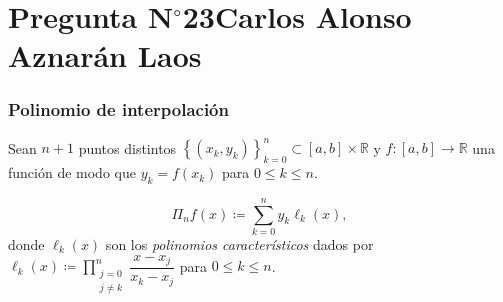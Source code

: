 \section{Pregunta N$^{\circ}$23\qquad Carlos Alonso Aznarán Laos}

\begin{frame}
	\frametitle{Polinomio de interpolación}

	Sean $n+1$ puntos distintos
	\begin{math}
		{
			\left\{
			\left(x_{k},y_{k}\right)
			\right\}
		}_{k=0}^{n}\subset
		\left[a,b\right]\times\mathbb{R}
	\end{math}
	y
	\begin{math}
		f\colon\left[a,b\right]\to
		\mathbb{R}
	\end{math}
	una función de modo que
	\begin{math}
		y_{k}=
		f\left(x_{k}\right)
	\end{math}
	para $0\leq k\leq n$.

	\begin{definition}
		\begin{equation*}
			\Pi_{n}
			f\left(x\right)\coloneqq
			\sum\limits_{k=0}^{n}
			y_{k}
			\ell_{k}\left(x\right),
		\end{equation*}
		donde $\ell_{k}\left(x\right)$ son los
		\emph{polinomios característicos} dados por
		\begin{math}
			\ell_{k}
			\left(x\right)\coloneq
			\prod\limits_{\substack{j=0\\j\neq k}}^{n}
			\dfrac{x-x_{j}}{x_{k}-x_{j}}
		\end{math}
		para $0\leq k\leq n$.
	\end{definition}



\end{frame}
